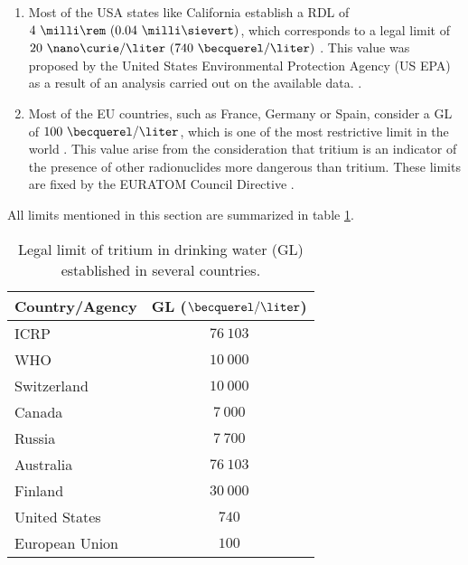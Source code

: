 \begin{enumerate}
\item{} Most of the USA states like California establish a RDL of $4~\milli\rem~(0.04~\milli\sievert)$, which corresponds to a legal limit of $20~\nano\curie/\liter~(740~\becquerel/\liter)$ \cite{California_GL}. This value was proposed by the United States Environmental Protection Agency (US EPA) as a result of an analysis carried out on the available data. \cite{USEPA_GL}.

\item{} Most of the EU countries, such as France, Germany or Spain, consider a GL of $100~\becquerel/\liter$, which is one of the most restrictive limit in the world \cite{France_GL, Germany_GL, Spain_GL}. This value arise from the consideration that tritium is an indicator of the presence of other radionuclides more dangerous than tritium. These limits are fixed by the EURATOM Council Directive \cite{EURATOM_GL}. 
\end{enumerate}

All limits mentioned in this section are summarized in table \ref{tab:LegalLimitTritium}.

\begin{table}[htbp]
\centering{}%
\begin{tabular}{lc}
\toprule 
Country/Agency & GL ($\becquerel/\liter$) \tabularnewline
\midrule
\midrule 
ICRP & $76~103$ \tabularnewline
WHO & $10~000$ \tabularnewline
Switzerland & $10~000$ \tabularnewline
Canada & $7~000$ \tabularnewline
Russia & $7~700$ \tabularnewline
Australia & $76~103$ \tabularnewline
Finland & $30~000$ \tabularnewline
United States & $740$ \tabularnewline
European Union & $100$ \tabularnewline
\bottomrule
\end{tabular}
\caption{Legal limit of tritium in drinking water (GL) established in several countries.}
\label{tab:LegalLimitTritium}
\end{table}